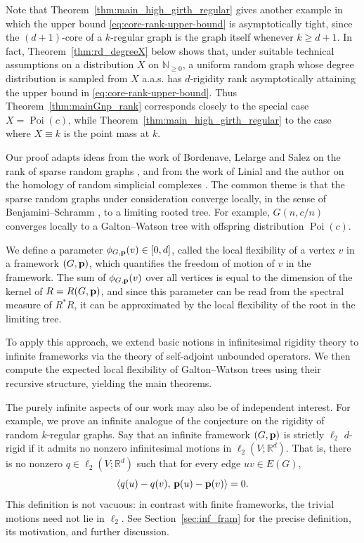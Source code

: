 \documentclass[reqno,english]{amsart}
\numberwithin{equation}{section}
\theoremstyle{definition}{
\newtheorem{example}[theorem]{Example}
\newtheorem{definition}[theorem]{Definition}
\newtheorem*{definition*}{Definition}
\newtheorem{problem}[theorem]{Problem}
\newtheorem{question}[theorem]{Question}
}
\newcommand{\R}{\mathbb R}
\newcommand{\p}{{\bf p}}
\begin{document}
Note that Theorem~\ref{thm:main_high_girth_regular} gives another example
in which the upper bound \eqref{eq:core-rank-upper-bound} is asymptotically
tight, since the \((d+1)\)-core of a \(k\)-regular graph is the graph itself
whenever \(k\ge d+1\). In fact, Theorem~\ref{thm:rd_degreeX} below shows that,
under suitable technical assumptions on a distribution \(X\) on
\(\mathbb N_{\ge 0}\), a uniform random graph whose degree distribution is
sampled from \(X\) a.a.s. has \(d\)-rigidity rank asymptotically attaining
the upper bound in \eqref{eq:core-rank-upper-bound}. Thus
Theorem~\ref{thm:mainGnp_rank} corresponds closely to the special case
\(X=\operatorname{Poi}(c)\), while Theorem~\ref{thm:main_high_girth_regular}
 to the case where \(X\equiv k\) is the point mass at \(k\).

\medskip

Our proof adapts ideas from the work of Bordenave, Lelarge and Salez on the
rank of sparse random graphs \cite{BordenaveLelargeSalezDiluted}, and from
the work of Linial and the author on the homology of random simplicial
complexes \cite{LinialPeledHomology}. The common theme is that the sparse
random graphs under consideration converge locally, in the sense of
Benjamini--Schramm \cite{BenjaminiSchramm2001}, to a limiting rooted tree.
For example, \(G(n,c/n)\) converges locally to a Galton--Watson tree with
offspring distribution \(\operatorname{Poi}(c)\).

We define a parameter \(\phi_{G,\p}(v)\in[0,d]\), called the local
flexibility of a vertex \(v\) in a framework \((G,\p)\), which quantifies
the freedom of motion of \(v\) in the framework. The sum of
\(\phi_{G,\p}(v)\) over all vertices is equal to the dimension of the
kernel of \(R=R(G,\p)\), and since this parameter can be read from the spectral
measure of \(R^*R\), it can be approximated by the local flexibility of the
root in the limiting tree.

To apply this approach, we extend basic notions in infinitesimal rigidity theory to infinite frameworks via the theory of self-adjoint unbounded operators. We then compute the expected local flexibility of Galton--Watson trees using their recursive structure, yielding the main theorems.

\medskip

The purely infinite aspects of our work may also be of independent interest. For
example, we prove an infinite analogue of the conjecture on the rigidity of
random \(k\)-regular graphs. Say that an infinite framework \((G,\p)\) is
strictly \(\ell_2\) \(d\)-rigid if it admits no nonzero infinitesimal motions
in \(\ell_2(V;\R^d)\). That is, there is no nonzero
\(q\in\ell_2(V;\R^d)\) such that for every edge \(uv\in E(G)\),
\[
    \langle q(u)-q(v),\,\p(u)-\p(v)\rangle=0.
\]
This definition is not vacuous: in contrast with finite frameworks, the trivial motions need not lie in $\ell_2$. See Section~\ref{sec:inf_fram} for the precise definition, its motivation, and further discussion.
\end{document}
